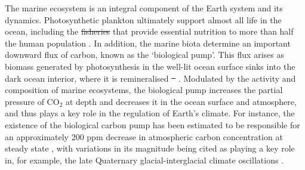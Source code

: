 \documentclass[gmd, manuscript]{copernicus}
\providecommand{\DIFadd}[1]{{\protect\color{blue}\uwave{#1}}} %
\providecommand{\DIFdel}[1]{{\protect\color{red}\sout{#1}}}                      %
\providecommand{\DIFaddbegin}{} %
\providecommand{\DIFaddend}{} %
\providecommand{\DIFdelbegin}{} %
\providecommand{\DIFdelend}{} %
\begin{document}
The marine ecosystem is an integral component of the Earth system and its dynamics. Photosynthetic plankton ultimately support almost all life in the ocean, including the \DIFdelbegin \DIFdel{fisheries }\DIFdelend \DIFaddbegin \DIFadd{fish stocks }\DIFaddend that provide essential nutrition to more than half the human population \citep{Hollowed:2013}. In addition, the marine biota determine an important downward flux of carbon, known as the `biological pump'. This flux arises as biomass generated by photosynthesis in the well-lit ocean surface sinks into the dark ocean interior, where it is remineralised \DIFdelbegin \DIFdel{\mbox{%
\citep{Hulse:2017}}\hspace{0pt}%
}\DIFdelend \DIFaddbegin \DIFadd{\mbox{%
\citep[e.g.][]{Hulse:2017}}\hspace{0pt}%
}\DIFaddend . Modulated by the activity and composition of marine ecosystems, the biological pump increases the partial pressure of CO$_2$ at depth and decreases it in the ocean surface and atmosphere, and thus plays a key role in the regulation of Earth's climate. For instance, the existence of the biological carbon pump has been estimated to be responsible for an approximately 200 ppm decrease in atmospheric carbon concentration at steady state \citep{Parekh:2006}, with variations in its magnitude being cited as playing a key role in, for example, the late Quaternary glacial-interglacial climate oscillations \citep{Watson:2000,Hain:2014}.
\end{document}
